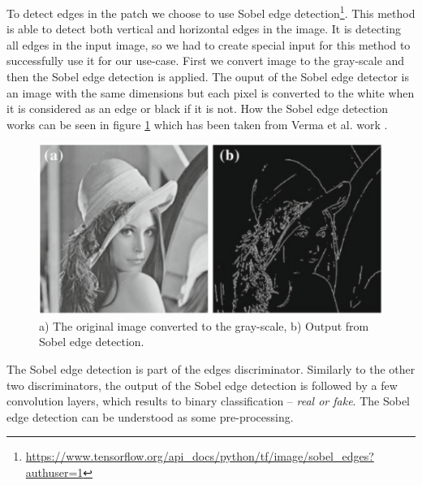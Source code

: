 \documentclass[a4paper, 11pt]{article}
\begin{document}
To detect edges in the patch we choose to use Sobel edge detection\footnote{\href{https://www.tensorflow.org/api_docs/python/tf/image/sobel_edges?authuser=1}{https://www.tensorflow.org/api\_docs/python/tf/image/sobel\_edges?authuser=1}}. This method is able to detect both vertical and horizontal edges in the image. It is detecting all edges in the input image, so we had to create special input for this method to successfully use it for our use-case.
First we convert image to the gray-scale and then the Sobel edge detection is applied.
The ouput of the Sobel edge detector is an image with the same dimensions but each pixel is converted to the white when it is considered as an edge or black if it is not. How the Sobel edge detection works can be seen in figure \ref{img:sobel} which has been taken from Verma et al. work \cite{sobel}.
\begin{figure}
    \centering
    \includegraphics[width=0.65\linewidth]{documentation/img/sobel.png}
    \caption{a) The original image converted to the gray-scale, b) Output from Sobel edge detection.\cite{sobel}}
    \label{img:sobel}
\end{figure}

The Sobel edge detection is part of the edges discriminator. Similarly to the other two discriminators, the output of the Sobel edge detection is followed by a few convolution layers, which results to binary classification -- \textit{real or fake}. The Sobel edge detection can be understood as some pre-processing.
\end{document}
